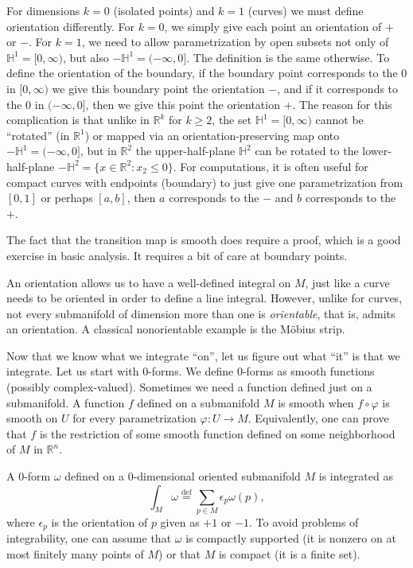 \documentclass[12pt,openany]{book}
\newcommand{\R}{{\mathbb{R}}}
\newcommand{\bH}{{\mathbb{H}}}
\theoremstyle{plain}
\theoremstyle{remark}
\theoremstyle{definition}
\theoremstyle{exercise}
\theoremstyle{example}
\begin{document}
For dimensions $k=0$ (isolated points) and $k=1$ (curves) we must define
orientation differently.  For $k=0$, we simply give each point an
orientation of $+$ or $-$.  For $k=1$, we need to allow parametrization by
open subsets not only of $\bH^1 = [0,\infty)$, but also $-\bH^1 = (-\infty,0]$.
The definition is the same otherwise.  To define the orientation
of the boundary, if the boundary point corresponds to the $0$ in
$[0,\infty)$ we give this boundary point the orientation
$-$, and if it corresponds to the $0$ in $(-\infty,0]$, then
we give this point the orientation $+$.  The reason for this complication is
that unlike in $\R^k$ for $k \geq 2$, the set $\bH^1 = [0,\infty)$ cannot be
``rotated'' (in $\R^1$) or mapped via an orientation-preserving map onto
$-\bH^1 = (-\infty,0]$, but in $\R^2$ the upper-half-plane $\bH^2$ can
be rotated to the lower-half-plane $-\bH^2 = \{ x \in \R^2 : x_2 \leq 0 \}$.
For computations, it is often useful for compact curves
with endpoints (boundary) to just give one
parametrization from $[0,1]$ or perhaps $[a,b]$, then $a$ corresponds to the
$-$ and $b$ corresponds to the $+$.

The fact that the transition map is smooth does require a proof, which is a
good exercise in basic analysis.  It requires a bit of care at boundary
points.

An orientation allows us to have a well-defined integral on $M$, just
like a curve needs to be oriented in order to define a line integral.
However, unlike for curves, not every submanifold of dimension
more than one is \emph{orientable}, that is, admits an orientation.
A classical nonorientable example is the M\"obius strip.

\medskip

Now that we know what we integrate ``on'', let us figure out what ``it'' is
that we integrate.  Let us start with $0$-forms.
We define $0$-forms as smooth functions (possibly complex-valued).
Sometimes we need a function defined just on a submanifold.  A function $f$ defined
on a submanifold $M$ is smooth when $f \circ \varphi$ is smooth on $U$
for every parametrization $\varphi \colon U \to M$.  Equivalently,
one can prove that $f$ is the restriction of some smooth function
defined on some neighborhood of $M$ in $\R^n$.

A $0$-form $\omega$ defined on a $0$-dimensional oriented submanifold $M$
is integrated as
\begin{equation*}
\int_M \omega
\overset{\text{def}}{=}
\sum_{p \in M} \epsilon_p \omega(p) ,
\end{equation*}
where $\epsilon_p$ is the orientation of $p$ given as $+1$ or $-1$.
To avoid problems of integrability,
one can assume that $\omega$ is compactly supported (it is
nonzero on at most finitely many points of $M$) or that $M$ is compact (it
is a finite set).
\end{document}
